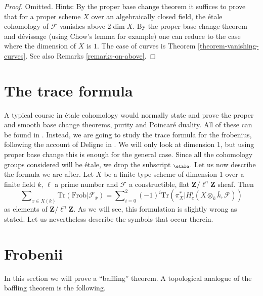 \begin{proof}
Omitted. Hints: By the proper base change theorem it suffices to
prove that for a proper scheme $X$ over an algebraically closed
field, the \'etale cohomology of $\mathcal{F}$ vanishes
above $2\dim X$. By the proper base change theorem and d\'evissage
(using Chow's lemma for example)
one can reduce to the case where the dimension of $X$ is $1$.
The case of curves is Theorem \ref{theorem-vanishing-curves}.
See also Remarks \ref{remarks-on-above}.
\end{proof}








\section{The trace formula}
\label{section-trace-formula}

\noindent
A typical course in \'etale cohomology would normally state and prove the
proper and smooth base change theorems, purity and Poincar\'e duality. All of
these can be found in \cite[Arcata]{SGA4.5}. Instead, we are going to study the
trace formula for the frobenius, following the account of Deligne in
\cite[Rapport]{SGA4.5}. We will only look at dimension 1, but using proper base
change this is enough for the general case. Since all the cohomology groups
considered will be \'etale, we drop the subscript $_\etale$. Let us
now describe
the formula we are after. Let $X$ be a finite type scheme of dimension 1 over a
finite field $k$, $\ell$ a prime number and $\mathcal{F}$ a constructible, flat
$\mathbf{Z}/\ell^n\mathbf{Z}$ sheaf. Then
\begin{equation}
\label{equation-trace-formula-initial}
\sum\nolimits_{x \in X(k)}
\text{Tr}(\text{Frob} | \mathcal{F}_{\bar x}) =
\sum\nolimits_{i=0}^2
(-1)^i \text{Tr}(\pi_X^* | H^i_c(X \otimes_k \bar k, \mathcal{F}))
\end{equation}
as elements of $\mathbf{Z}/\ell^n\mathbf{Z}$. As we will see, this formulation
is slightly wrong as stated. Let us nevertheless describe the symbols that
occur therein.




\section{Frobenii}
\label{section-frobenii}

\noindent
In this section we will prove a ``baffling'' theorem.
A topological analogue of the baffling theorem is the following.

